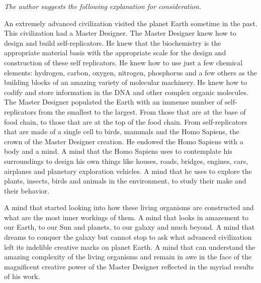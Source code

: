\textit{The author suggests the following explanation for
consideration.}

An extremely advanced civilization visited the planet Earth sometime in
the past. This civilization had a Master Designer.  The Master Designer
knew how to design and build self-replicators. He knew that the
biochemistry is the appropriate material basis with the appropriate
scale for the design and construction of these self replicators. He
knew how to use just a few chemical elements: hydrogen, carbon, oxygen,
nitrogen, phosphorus and a few others as the building blocks of an
amazing variety of molecular machinery. He knew how to codify and store
information in the DNA and other complex organic molecules. The Master
Designer populated the Earth with an immense number of self-replicators
from the smallest to the largest. From those that are at the base of
food chain, to those that are at the top of the food chain. From
self-replicators that are made of a single cell to birds, mammals and
the Homo Sapiens, the crown of the Master Designer creation.  He
endowed the Homo Sapiens with a body and a mind. A mind that the Homo
Sapiens uses to contemplate his surroundings to design his own things
like houses, roads, bridges, engines, cars, airplanes and planetary
exploration vehicles. A mind that he uses to explore the plants,
insects, birds and animals in the environment, to study their make and
their behavior.

A mind that started looking into how these living organisms are
constructed and what are the most inner workings of them. A mind that
looks in amazement to our Earth, to our Sun and planets, to our galaxy
and much beyond. A mind that dreams to conquer the galaxy but cannot
stop to ask what advanced civilization left its indelible creative
marks on planet Earth. A mind that can understand the amazing
complexity of the living organisms and remain in awe in the face of the
magnificent creative power of the Master Designer reflected in the
myriad results of his work.

